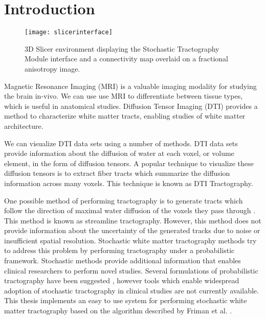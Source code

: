 \chapter{Introduction}

\begin{figure}
\center
	\texttt{[image: slicerinterface]}
	\caption{3D Slicer environment displaying the Stochastic Tractography Module interface and a connectivity map overlaid on a fractional anisotropy image.}
	\label{fig:Intro}
\end{figure}

Magnetic Resonance Imaging (MRI) is a valuable imaging modality for studying the brain in-vivo.  We can use use MRI to differentiate between tissue types, which is useful in anatomical studies.  Diffusion Tensor Imaging (DTI) provides a method to characterize white matter tracts, enabling studies of white matter architecture.

We can visualize DTI data sets using a number of methods.  DTI data sets provide information about the diffusion of water at each voxel, or volume element, in the form of diffusion tensors.  A popular technique to visualize these diffusion tensors is to extract fiber tracts which summarize the diffusion information across many voxels.  This technique is known as DTI Tractography.

One possible method of performing tractography is to generate tracts which follow the direction of maximal water diffusion of the voxels they pass through \cite{Mori99, Basser00}.  This method is known as streamline tractography.  However, this method does not provide information about the uncertainty of the generated tracks due to noise or insufficient spatial resolution.  Stochastic white matter tractography methods try to address this problem by performing tractography under a probabilistic framework.  Stochastic methods provide additional information that enables clinical researchers to perform novel studies.  Several formulations of probabilistic tractography have been suggested \cite{bjornemoMICCAI02,behrensMRM03,Tuch01,derek,Lazar05}, however tools which enable widespread adoption of stochastic tractography in clinical studies are not currently available.  This thesis implements an easy to use system for performing stochastic white matter tractography based on the algorithm described by Friman et al. \cite{frimanMICCAI05, frimanTMI06}.

